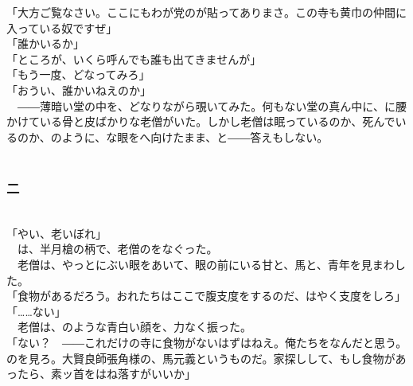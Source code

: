 \documentclass[
  paper=a5,
  fontsize=10pt,
  jafontsize=9.5pt,
  tate,                  %
  open_bracket_pos=nibu, %
]{jlreq}
\begin{document}
「大方ご覧なさい。ここにもわが党のが貼ってありまさ。この寺も黄巾の仲間に入っている奴ですぜ」\\


「誰かいるか」\\


「ところが、いくら呼んでも誰も出てきませんが」\\


「もう一度、どなってみろ」\\


「おうい、誰かいねえのか」\\


　――薄暗い堂の中を、どなりながら覗いてみた。何もない堂の真ん中に、に腰かけている骨と皮ばかりな老僧がいた。しかし老僧は眠っているのか、死んでいるのか、のように、な眼をへ向けたまま、と――答えもしない。\\

\\

\subsubsection{二}

\\


「やい、老いぼれ」\\


　は、半月槍の柄で、老僧のをなぐった。\\


　老僧は、やっとにぶい眼をあいて、眼の前にいる甘と、馬と、青年を見まわした。\\


「食物があるだろう。おれたちはここで腹支度をするのだ、はやく支度をしろ」\\


「……ない」\\


　老僧は、のような青白い顔を、力なく振った。\\


「ない？　――これだけの寺に食物がないはずはねえ。俺たちをなんだと思う。のを見ろ。大賢良師張角様の、馬元義というものだ。家探しして、もし食物があったら、素ッ首をはね落すがいいか」\\
\end{document}
